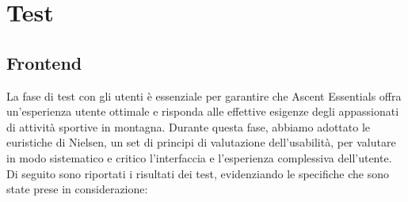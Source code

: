 \chapter{Test}

\section{Frontend}


La fase di test con gli utenti è essenziale per garantire che Ascent Essentials offra un'esperienza utente ottimale e risponda alle effettive esigenze degli appassionati di attività sportive in montagna. Durante questa fase, abbiamo adottato le euristiche di Nielsen, un set di principi di valutazione dell'usabilità, per valutare in modo sistematico e critico l'interfaccia e l'esperienza complessiva dell'utente. Di seguito sono riportati i risultati dei test, evidenziando le specifiche che sono state prese in considerazione:

